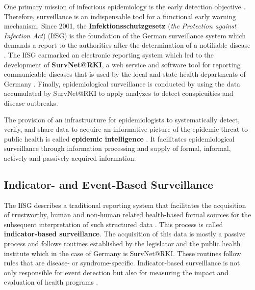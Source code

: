   One primary mission of infectious epidemiology is the early detection objective \citep{EarlyDetection}.
  Therefore, surveillance is an indispensable tool for a functional early warning mechanism.
  Since 2001, the \textbf{Infektionsschutzgesetz} (\textit{the Protection against Infection Act}) (\gls{IfSG})
  is the foundation of the German surveillance system which demands a report to the authorities after the determination of a notifiable disease \citep{IfSG}.
  The IfSG earmarked an electronic reporting system which led to the development of \textbf{SurvNet@RKI}, a web service and software tool for reporting communicable diseases that is used by the local and state health departments of Germany \citep{Faensen2006}.
  Finally, epidemiological surveillance is conducted by using the data accumulated by SurvNet@RKI to apply analyzes to detect conspicuities and disease outbreaks.

  The provision of an infrastructure for epidemiologists to systematically detect, verify, and share data to acquire an informative picture of the epidemic threat to public health is called \textbf{epidemic intelligence} \citep{EarlyDetection}.
  It facilitates epidemiological surveillance through information processing and supply of formal, informal, actively and passively acquired information.

\subsection{Indicator- and Event-Based Surveillance}
  The IfSG describes a traditional reporting system that facilitates the acquisition of trustworthy, human and non-human related health-based formal sources for the subsequent interpretation of such structured data \citep{EarlyDetection}.
  This process is called \textbf{indicator-based surveillance}.
  The acquisition of this data is mostly a passive process and follows routines established by the legislator and the public health institute which in the case of Germany is SurvNet@RKI.
  These routines follow rules that are disease- or syndrome-specific.
  Indicator-based surveillance is not only responsible for event detection but also for measuring the impact and evaluation of health programs \citep{EarlyDetection}.

